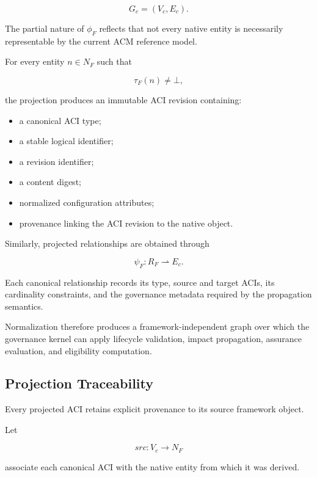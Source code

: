 \documentclass[10pt]{article}
\begin{document}
\[
G_c=(V_c,E_c).
\]

The partial nature of $\phi_F$ reflects that not every native entity is
necessarily representable by the current ACM reference model.

For every entity $n\in N_F$ such that

\[
\tau_F(n)\neq\bot,
\]

the projection produces an immutable ACI revision containing:

\begin{itemize}
	\item a canonical ACI type;
	\item a stable logical identifier;
	\item a revision identifier;
	\item a content digest;
	\item normalized configuration attributes;
	\item provenance linking the ACI revision to the native object.
\end{itemize}

Similarly, projected relationships are obtained through

\begin{equation}
\psi_F :
R_F
\rightharpoonup
E_c.
\end{equation}

Each canonical relationship records its type, source and target ACIs, its
cardinality constraints, and the governance metadata required by the
propagation semantics.

Normalization therefore produces a framework-independent graph over which the
governance kernel can apply lifecycle validation, impact propagation, assurance
evaluation, and eligibility computation.

\subsection{Projection Traceability}

Every projected ACI retains explicit provenance to its source framework object.

Let

\begin{equation}
src :
V_c
\rightarrow
N_F
\end{equation}

associate each canonical ACI with the native entity from which it was derived.
\end{document}
